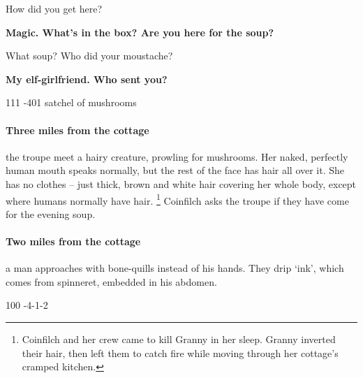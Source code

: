 \documentclass[10pt,twoside]{book}
\begin{document}
\begin{speechtext}

  How did you get here?

  \noindent
  \textbf{Magic.
  What's in the box?
  Are you here for the soup?}

  What soup?
  Who did your moustache?

  \noindent
  \textbf{My elf-girlfriend.
  Who sent you?}
\end{speechtext}

\togglefalse{examplecharacter}

%
  {{1}{1}{1}}%
  {{-4}{0}{1}}%
  {%
    \rapier
    \renewcommand\weaponName{rapier (hidden in fur)}
  }%
  {}%
  {satchel of mushrooms}%
  {}%

\paragraph{Three miles from the cottage}
the troupe meet a hairy creature, prowling for mushrooms.
Her naked, perfectly human mouth speaks normally, but the rest of the face has hair all over it.
She has no clothes -- just thick, brown and white hair covering her whole body, except where humans normally have hair.%
\footnote{Coinfilch and her crew came to kill Granny in her sleep.
Granny inverted their hair, then left them to catch fire while moving through her cottage's cramped kitchen.}
Coinfilch asks the troupe if they have come for the evening soup.

\paragraph{Two miles from the cottage}
a man approaches with bone-quills instead of his hands.
They drip `ink', which comes from  spinneret, embedded in his abdomen.

%
  {{1}{0}{0}}%
  {{-4}{-1}{-2}}%
  {%
  }%
  {}%
  {}%
  {%
  }%
\end{document}
